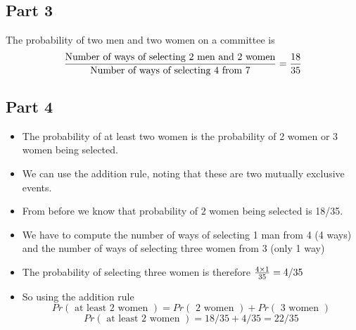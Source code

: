 \documentclass[]{report}
\begin{document}
\subsection*{Part 3}

The probability of two men and two women on a committee is
\[ {\mbox{Number of ways of selecting 2 men and 2 women} \over \mbox{Number of ways of selecting 4 from 7}} = {18 \over 35 }\]


\subsection*{Part 4}
\begin{itemize}
\item The probability of at least two women is the probability of 2 women or 3 women being selected.
\item We can use the addition rule, noting that these are two mutually exclusive events.
\item From before we know that probability of 2 women being selected is 18/35.
\item We have to compute the number of ways of selecting 1 man from 4 (4 ways) and the number of ways of selecting three women from 3 (only 1 way)
\item The probability of selecting three women is therefore ${4 \times 1 \over 35} = 4/35$
\item So using the addition rule
\[ Pr(\mbox{ at least 2 women }) = Pr(\mbox{ 2 women }) + Pr(\mbox{ 3 women }) \]
\[ Pr(\mbox{ at least 2 women })  = 18/35 + 4/35 = 22/35 \]
\end{itemize}

\end{document}
